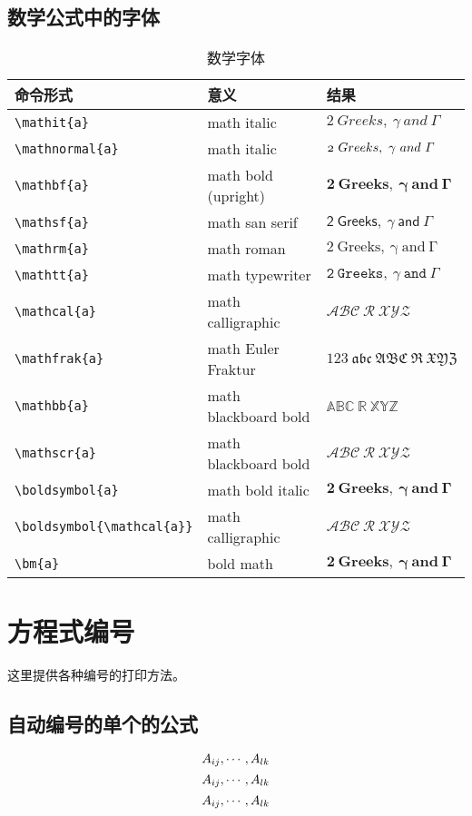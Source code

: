 \subsection{数学公式中的字体}
\newcommand\axy{2\ Greeks,\ \gamma\ and\ \Gamma}
\setlength{\extrarowheight}{-2mm}
\begin{table}[htbp]
\centering
{\small
\caption{数学字体\label{table:mathfont}}
\begin{tabular}{lll}
命令形式   &  意义     &   结果   \\
\toprule
\verb/\mathit{a}/ &  math italic  & $\mathit{\axy}$\\
\verb/\mathnormal{a}/ &  math italic  & $\mathnormal{\axy}$\\
\verb/\mathbf{a}/ &  math bold (upright)    & $\mathbf{\axy}$\\
\midrule
\verb/\mathsf{a}/ &  math san serif  & $\mathsf{\axy}$\\
\verb/\mathrm{a}/ &  math roman  & $\mathrm{\axy}$\\
\verb/\mathtt{a}/ &  math typewriter  & $\mathtt{\axy}$\\
\midrule
\verb/\mathcal{a}/ &  math calligraphic  & $\mathcal{ABC\ R\ XYZ}$\\
\verb/\mathfrak{a}/ &  math Euler Fraktur  & $\mathfrak{123\ abc\ ABC\ R\ XYZ}$\\
\verb/\mathbb{a}/ &  math blackboard bold  & $\mathbb{ABC\ R\ XYZ}$\\
\verb/\mathscr{a}/ &  math blackboard bold  & $\mathscr{ABC\ R\ XYZ}$\\
\midrule
\verb/\boldsymbol{a}/ &  math bold italic    & $\boldsymbol{\axy}$\\
\verb/\boldsymbol{\mathcal{a}}/ &  math calligraphic  & $\boldsymbol{\mathcal{ABC\ R\ XYZ}}$\\
\verb/\bm{a}/ &  bold math & $\bm{\axy}$\\
\bottomrule
\end{tabular}}
\end{table}

\section{方程式编号}
这里提供各种编号的打印方法。

\addtocounter{equation}{1}
\subsection{自动编号的单个的公式}
\begin{equation}
   \subvec [A]{ij}{lk}
\end{equation}
\begin{equation}
   \subvec [A]{ij}{lk}
\end{equation}
\begin{equation}
   \subvec [A]{ij}{lk}
\end{equation}
